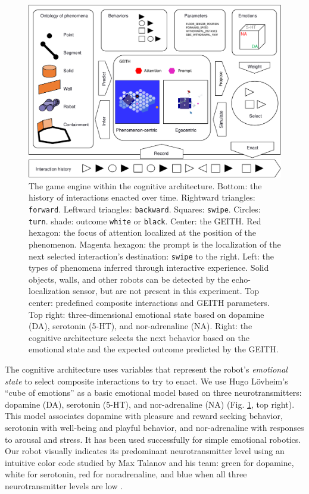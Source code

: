 \documentclass[runningheads]{llncs}
\begin{document}
\begin{figure}
	\includegraphics[width=\textwidth]{Figure_geith.pdf}
	\caption{The game engine within the cognitive architecture.
		Bottom: the history of interactions enacted over time.
		Rightward triangles: \texttt{forward}. Leftward triangles: \texttt{backward}. Squares: \texttt{swipe}. Circles: \texttt{turn}. shade: outcome \texttt{white} or \texttt{black}.
		Center: the GEITH.
		Red hexagon: the focus of attention localized at the position of the phenomenon. 
		Magenta hexagon: the prompt is the localization of the next selected interaction's destination: \texttt{swipe} to the right.
		Left: the types of phenomena inferred through interactive experience.
		Solid objects, walls, and other robots can be detected by the echo-localization sensor, but are not present in this experiment.
		Top center: predefined composite interactions and GEITH parameters.
		Top right: three-dimensional emotional state based on dopamine (DA), serotonin (5-HT), and nor-adrenaline (NA).
		Right: the cognitive architecture selects the next behavior based on the emotional state and the expected outcome predicted by the GEITH.} \label{fig:geith}
\end{figure}

The cognitive architecture uses variables that represent the robot's \textit{emotional state} to select composite interactions to try to enact.
We use Hugo Lövheim's ``cube of emotions'' \cite{lovheim_new_2012} as a basic emotional model based on three neurotransmitters: dopamine (DA), serotonin (5-HT), and nor-adrenaline (NA) (Fig. \ref{fig:geith}, top right).
This model associates dopamine with pleasure and reward seeking behavior, serotonin with well-being and playful behavior, and nor-adrenaline with responses to arousal and stress.
It has been used successfully for simple emotional robotics.
Our robot visually indicates its predominant neurotransmitter level using an intuitive color code studied by Max Talanov and his team: green for dopamine, white for serotonin, red for noradrenaline, and blue when all three neurotransmitter levels are low \cite{chebotareva_emotional_2019}.
\end{document}

